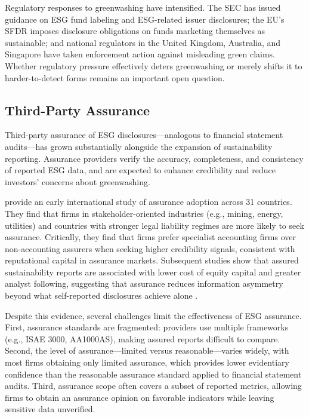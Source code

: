 Regulatory responses to greenwashing have intensified. The SEC has issued
guidance on ESG fund labeling and ESG-related issuer disclosures; the EU's SFDR
imposes disclosure obligations on funds marketing themselves as sustainable; and
national regulators in the United Kingdom, Australia, and Singapore have taken
enforcement action against misleading green claims. Whether regulatory pressure
effectively deters greenwashing or merely shifts it to harder-to-detect forms
remains an important open question.

\subsection{Third-Party Assurance}
\label{subsec:assurance}

Third-party assurance of ESG disclosures---analogous to financial statement
audits---has grown substantially alongside the expansion of sustainability
reporting. Assurance providers verify the accuracy, completeness, and
consistency of reported ESG data, and are expected to enhance credibility and
reduce investors' concerns about greenwashing.

\textcite{Simnett2009_assurance} provide an early international study of
assurance adoption across 31 countries. They find that firms in
stakeholder-oriented industries (e.g., mining, energy, utilities) and countries
with stronger legal liability regimes are more likely to seek assurance.
Critically, they find that firms prefer specialist accounting firms over
non-accounting assurers when seeking higher credibility signals, consistent with
reputational capital in assurance markets. Subsequent studies show that assured
sustainability reports are associated with lower cost of equity capital and
greater analyst following, suggesting that assurance reduces information
asymmetry beyond what self-reported disclosures achieve alone
\citep{Dhaliwal2011_csr_cost}.

Despite this evidence, several challenges limit the effectiveness of ESG
assurance. First, assurance standards are fragmented: providers use multiple
frameworks (e.g., ISAE 3000, AA1000AS), making assured reports difficult to
compare. Second, the level of assurance---limited versus reasonable---varies
widely, with most firms obtaining only limited assurance, which provides lower
evidentiary confidence than the reasonable assurance standard applied to
financial statement audits. Third, assurance scope often covers a subset of
reported metrics, allowing firms to obtain an assurance opinion on favorable
indicators while leaving sensitive data unverified.

